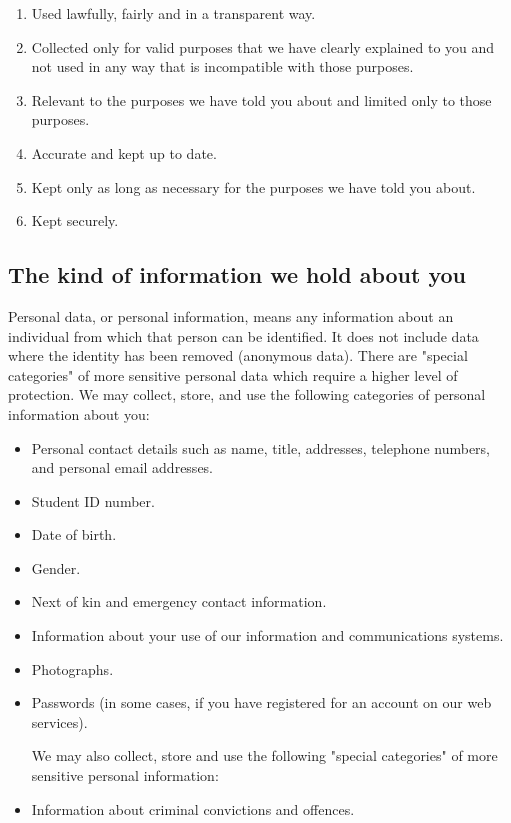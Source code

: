 \documentclass[12pt]{article}
\begin{document}
\begin{enumerate}
\item Used lawfully, fairly and in a transparent way.
\item Collected only for valid purposes that we have clearly explained to you and not used in any way that is incompatible with those purposes.
\item Relevant to the purposes we have told you about and limited only to those purposes.
\item Accurate and kept up to date.
\item Kept only as long as necessary for the purposes we have told you about.
\item Kept securely.
\end{enumerate}

\subsection{The kind of information we hold about you}
Personal data, or personal information, means any information about an individual from which that person can be identified. It does not include data where the identity has been removed (anonymous data).
There are "special categories" of more sensitive personal data which require a higher level of protection.
We may collect, store, and use the following categories of personal information about you:

\begin{itemize}
\item Personal contact details such as name, title, addresses, telephone numbers, and personal email addresses.
\item Student ID number.
\item Date of birth.
\item Gender.
\item Next of kin and emergency contact information.
\item Information about your use of our information and communications systems.
\item Photographs.
\item Passwords (in some cases, if you have registered for an account on our web services).

We may also collect, store and use the following "special categories" of more sensitive personal information:
\item Information about criminal convictions and offences.

\end{itemize}
\end{document}
